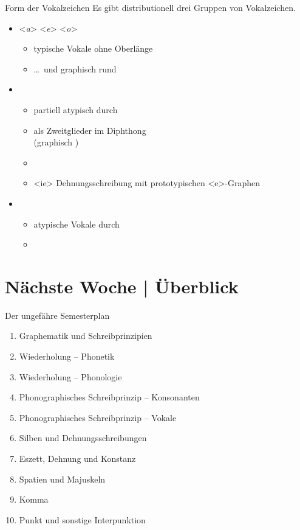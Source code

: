 \begin{frame}
  {Form der Vokalzeichen}
  \onslide<+->
  \onslide<+->
  Es gibt distributionell drei Gruppen von Vokalzeichen.\\
  \Zeile
  \begin{itemize}[<+->]
    \item \alert{<\textit{a}> <\textit{e}> <\textit{o}>}
      \begin{itemize}[<+->]
        \item typische Vokale \alert{ohne Oberlänge}
        \item \ldots\ und \alert{graphisch rund}
      \end{itemize}
      \Halbzeile
    \item {}
      \begin{itemize}[<+->]
        \item partiell atypisch durch 
        \item als Zweitglieder im Diphthong \\
          (graphisch )
        \item {}
        \item{} <ie> Dehnungsschreibung mit prototypischen <e>-Graphen
      \end{itemize}
      \Halbzeile
    \item {}
      \begin{itemize}[<+->]
        \item atypische Vokale durch 
        \item {}
      \end{itemize}
  \end{itemize}
\end{frame}

\ifdefined\TITLE
  \section{Nächste Woche | Überblick}

  \begin{frame}
    {Der ungefähre Semesterplan}
    \begin{enumerate}[<+->]
      \item Graphematik und Schreibprinzipien
      \item Wiederholung -- Phonetik
      \item Wiederholung -- Phonologie
      \item Phonographisches Schreibprinzip -- Konsonanten
      \item Phonographisches Schreibprinzip -- Vokale
      \item \alert{Silben und Dehnungsschreibungen}
      \item Eszett, Dehnung und Konstanz
      \item Spatien und Majuskeln
      \item Komma
      \item Punkt und sonstige Interpunktion
    \end{enumerate}
  \end{frame}
\fi
